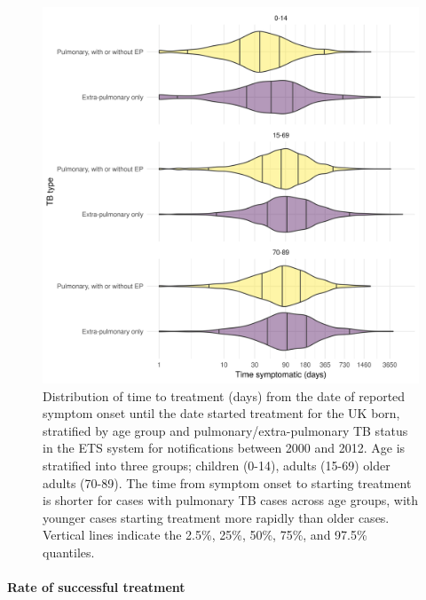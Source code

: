 \documentclass[11pt,twoside]{bristolthesis}
\begin{document}
  \newpage
  \begin{figure}
  
  {\centering \includegraphics[width=0.8\linewidth,]{chapters/model-development/resources/figure/time_to_treatment} 
  
  }
  
  \caption[Distribution of time to treatment (days) from the date of reported symptom onset until the date started treatment for the UK born, stratified by age group and pulmonary/extra-pulmonary TB status in the ETS system for notifications between 2000 and 2012.]{Distribution of time to treatment (days) from the date of reported symptom onset until the date started treatment for the UK born, stratified by age group and pulmonary/extra-pulmonary TB status in the ETS system for notifications between 2000 and 2012. Age is stratified into three groups; children (0-14), adults (15-69) older adults (70-89). The time from symptom onset to starting treatment is shorter for cases with pulmonary TB cases across age groups, with younger cases starting treatment more rapidly than older cases. Vertical lines indicate the 2.5\%, 25\%, 50\%, 75\%, and 97.5\% quantiles.}\label{fig:tb-time-treat}
  \end{figure}
  \hypertarget{rate-of-successful-treatment}{%
  \paragraph{Rate of successful treatment}\label{rate-of-successful-treatment}}
  
\end{document}
